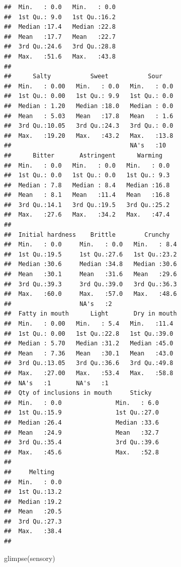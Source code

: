 \documentclass[
]{krantz}
\makeatletter
\newenvironment{Shaded}{\begin{snugshade}}{\end{snugshade}}
\newcommand{\FunctionTok}[1]{\textcolor[rgb]{0,0,0}{#1}}
\newcommand{\NormalTok}[1]{#1}
\newenvironment{kframe}{%
\medskip{}
\setlength{\fboxsep}{.8em}
 \def\at@end@of@kframe{}%
 \ifinner\ifhmode%
  \def\at@end@of@kframe{\end{minipage}}%
  \begin{minipage}{\columnwidth}%
 \fi\fi%
 \def\FrameCommand##1{\hskip\@totalleftmargin \hskip-\fboxsep
 \colorbox{shadecolor}{##1}\hskip-\fboxsep
     \hskip-\linewidth \hskip-\@totalleftmargin \hskip\columnwidth}%
 \MakeFramed {\advance\hsize-\width
   \@totalleftmargin\z@ \linewidth\hsize
   \@setminipage}}%
 {\par\unskip\endMakeFramed%
 \at@end@of@kframe}
\renewenvironment{Shaded}{\begin{kframe}}{\end{kframe}}
\makeatother
\begin{document}
\begin{verbatim}
##  Min.   : 0.0   Min.   : 0.0              
##  1st Qu.: 9.0   1st Qu.:16.2              
##  Median :17.4   Median :22.8              
##  Mean   :17.7   Mean   :22.7              
##  3rd Qu.:24.6   3rd Qu.:28.8              
##  Max.   :51.6   Max.   :43.8              
##                                           
##      Salty           Sweet           Sour     
##  Min.   : 0.00   Min.   : 0.0   Min.   : 0.0  
##  1st Qu.: 0.00   1st Qu.: 9.9   1st Qu.: 0.0  
##  Median : 1.20   Median :18.0   Median : 0.0  
##  Mean   : 5.03   Mean   :17.8   Mean   : 1.6  
##  3rd Qu.:10.05   3rd Qu.:24.3   3rd Qu.: 0.0  
##  Max.   :19.20   Max.   :43.2   Max.   :13.8  
##                                 NA's   :10    
##      Bitter       Astringent      Warming    
##  Min.   : 0.0   Min.   : 0.0   Min.   : 0.0  
##  1st Qu.: 0.0   1st Qu.: 0.0   1st Qu.: 9.3  
##  Median : 7.8   Median : 8.4   Median :16.8  
##  Mean   : 8.1   Mean   :11.4   Mean   :16.8  
##  3rd Qu.:14.1   3rd Qu.:19.5   3rd Qu.:25.2  
##  Max.   :27.6   Max.   :34.2   Max.   :47.4  
##                                              
##  Initial hardness    Brittle        Crunchy    
##  Min.   : 0.0     Min.   : 0.0   Min.   : 8.4  
##  1st Qu.:19.5     1st Qu.:27.6   1st Qu.:23.2  
##  Median :30.6     Median :34.8   Median :30.6  
##  Mean   :30.1     Mean   :31.6   Mean   :29.6  
##  3rd Qu.:39.3     3rd Qu.:39.0   3rd Qu.:36.3  
##  Max.   :60.0     Max.   :57.0   Max.   :48.6  
##                   NA's   :2                    
##  Fatty in mouth      Light       Dry in mouth 
##  Min.   : 0.00   Min.   : 5.4   Min.   :11.4  
##  1st Qu.: 0.00   1st Qu.:22.8   1st Qu.:39.0  
##  Median : 5.70   Median :31.2   Median :45.0  
##  Mean   : 7.36   Mean   :30.1   Mean   :43.0  
##  3rd Qu.:13.05   3rd Qu.:36.6   3rd Qu.:49.8  
##  Max.   :27.00   Max.   :53.4   Max.   :58.8  
##  NA's   :1       NA's   :1                    
##  Qty of inclusions in mouth     Sticky    
##  Min.   : 0.0               Min.   : 6.0  
##  1st Qu.:15.9               1st Qu.:27.0  
##  Median :26.4               Median :33.6  
##  Mean   :24.9               Mean   :32.7  
##  3rd Qu.:35.4               3rd Qu.:39.6  
##  Max.   :45.6               Max.   :52.8  
##                                           
##     Melting    
##  Min.   : 0.0  
##  1st Qu.:13.2  
##  Median :19.2  
##  Mean   :20.5  
##  3rd Qu.:27.3  
##  Max.   :38.4  
## 
\end{verbatim}

\begin{Shaded}
\begin{Highlighting}[]
\FunctionTok{glimpse}\NormalTok{(sensory)}
\end{Highlighting}
\end{Shaded}
\end{document}
